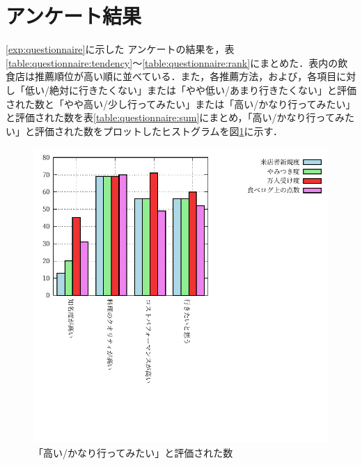 	\section{アンケート結果}
	\ref{exp:questionnaire}に示した
	アンケートの結果を，表\ref{table:questionnaire:tendency}〜\ref{table:questionnaire:rank}にまとめた．表内の飲食店は推薦順位が高い順に並べている．また，各推薦方法，および，各項目に対し「低い/絶対に行きたくない」または「やや低い/あまり行きたくない」と評価された数と「やや高い/少し行ってみたい」または「高い/かなり行ってみたい」と評価された数を表\ref{table:questionnaire:sum}にまとめ，「高い/かなり行ってみたい」と評価された数をプロットしたヒストグラムを図\ref{fig:sum}に示す．
	
	
	
	
	
	
	
	\begin{figure}[H]
		\centering
		\includegraphics[width=\linewidth]{./figure/sum.pdf}
		\caption{「高い/かなり行ってみたい」と評価された数\label{fig:sum}}
	\end{figure}
